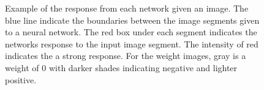 \documentclass{article}
\begin{document}
\begin{figure}[t, tight]
			\label{fig:exOutput}
			\vspace{-6pt}
			\caption{Example of the response from each network given an image.  The blue line indicate the boundaries between the image segments given to a neural network.  The red box under each segment indicates the networks response to the input image segment.  The intensity of red indicates the a strong response.  For the weight images, gray is a weight of 0 with darker shades indicating negative and lighter positive.}
			\vspace{-6pt}
		\end{figure}
\end{document}
